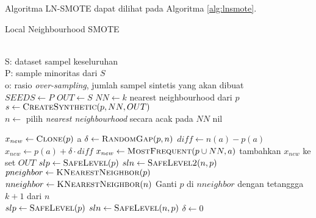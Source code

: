 Algoritma LN-SMOTE dapat dilihat pada Algoritma \ref{alg:lnsmote}.

\newpage
{}

\begin{algorithm}[t]
\caption{Local Neighbourhood SMOTE}
\label{alg:lnsmote}
\begin{multicols}{2}
\begin{algorithmic}[1]
\Require \\
S: dataset sampel keseluruhan \\
P: sample minoritas dari $ S $ \\
o: rasio \textit{over-sampling}, jumlah sampel sintetis yang akan dibuat \\

	\State $ SEEDS \gets P $
	\State $ OUT \gets S $
		\State $ NN \gets k $ nearest neighbourhood dari $ p $
			\Repeat
				\State $ s \gets \Call{CreateSynthetic}{p, NN,
				\newline
				OUT} $
		\EndFor
	\EndFor
	\State {}
\EndFunction
\\
	\State $ n \gets $ pilih \textit{nearest neighbourhood} secara acak
	pada $ NN $
		\State \Return nil
	\EndIf

	\State $ x_{new} \gets \Call{Clone}{p} $
	a
			\State $ \delta \gets \Call{RandomGap}{p, n} $
			\State $ diff \gets n(a) - p(a) $
			\State $ x_{new} \gets p(a) + \delta \cdot diff $
		\Else
			\State $ x_{new} \gets \Call{MostFrequent}{p \cup NN, a} $
		\EndIf
	\EndFor
	\State tambahkan $x_{new}$ ke set $OUT$
\EndFunction
\columnbreak
{}
	\State $ slp \gets \Call{SafeLevel}{p} $
	\State $ sln \gets \Call{SafeLevel2}{n, p} $
	\State {}
\EndFunction
\\
	\State $ pneighbor \gets \Call{KNearestNeighbor}{p} $
	\State {}
\EndFunction
\\
	\State $ nneighbor \gets \Call{KNearestNeighbor}{n} $
		\State Ganti $ p $ di $ nneighbor $ dengan tetanggga $ k + 1 $
		dari $ n $
	\EndIf
	\State {}
\EndFunction
\\
	\State $ slp \gets \Call{SafeLevel}{p} $
	\State $ sln \gets \Call{SafeLevel}{n, p} $
	\State $ \delta \gets 0 $


\end{algorithmic}
\end{multicols}
\end{algorithm}
